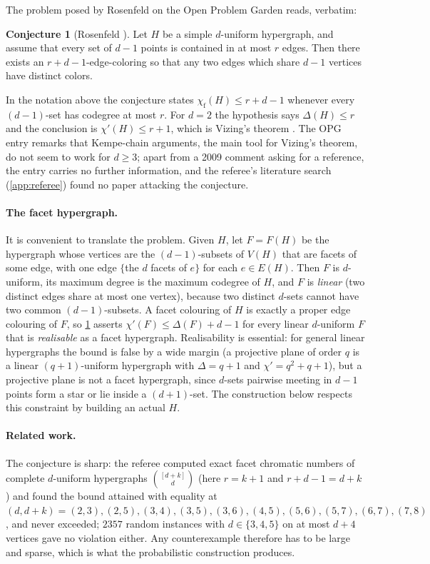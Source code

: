 \documentclass[11pt,a4paper]{article}
\theoremstyle{plain}
\theoremstyle{definition}
\newtheorem{conjecture}[theorem]{Conjecture}
\theoremstyle{remark}
\newcommand{\chif}{\chi_{\mathrm{f}}}
\begin{document}
The problem posed by Rosenfeld on the Open Problem Garden \cite{OPG} reads, verbatim:

\begin{conjecture}[{Rosenfeld \cite{OPG}}]\label{conj:rosenfeld}
Let $H$ be a simple $d$-uniform hypergraph, and assume that every set of $d-1$ points is contained in at most $r$ edges. Then there exists an $r+d-1$-edge-coloring so that any two edges which share $d-1$ vertices have distinct colors.
\end{conjecture}

In the notation above the conjecture states $\chif(H)\le r+d-1$ whenever every $(d-1)$-set has codegree at most $r$. For $d=2$ the hypothesis says $\Delta(H)\le r$ and the conclusion is $\chi'(H)\le r+1$, which is Vizing's theorem \cite{Vizing64}. The OPG entry remarks that Kempe-chain arguments, the main tool for Vizing's theorem, do not seem to work for $d\ge3$; apart from a 2009 comment asking for a reference, the entry carries no further information, and the referee's literature search (\cref{app:referee}) found no paper attacking the conjecture.

\paragraph{The facet hypergraph.} It is convenient to translate the problem. Given $H$, let $F=F(H)$ be the hypergraph whose vertices are the $(d-1)$-subsets of $V(H)$ that are facets of some edge, with one edge $\{$the $d$ facets of $e\}$ for each $e\in E(H)$. Then $F$ is $d$-uniform, its maximum degree is the maximum codegree of $H$, and $F$ is \emph{linear} (two distinct edges share at most one vertex), because two distinct $d$-sets cannot have two common $(d-1)$-subsets. A facet colouring of $H$ is exactly a proper edge colouring of $F$, so \cref{conj:rosenfeld} asserts $\chi'(F)\le\Delta(F)+d-1$ for every linear $d$-uniform $F$ that is \emph{realisable} as a facet hypergraph. Realisability is essential: for general linear hypergraphs the bound is false by a wide margin (a projective plane of order $q$ is a linear $(q+1)$-uniform hypergraph with $\Delta=q+1$ and $\chi'=q^2+q+1$), but a projective plane is not a facet hypergraph, since $d$-sets pairwise meeting in $d-1$ points form a star or lie inside a $(d+1)$-set. The construction below respects this constraint by building an actual $H$.

\paragraph{Related work.} The conjecture is sharp: the referee computed exact facet chromatic numbers of complete $d$-uniform hypergraphs $\binom{[d+k]}{d}$ (here $r=k+1$ and $r+d-1=d+k$) and found the bound attained with equality at $(d,d+k)=(2,3),(2,5),(3,4),(3,5),(3,6),(4,5),(5,6),(5,7),(6,7),(7,8)$, and never exceeded; $2357$ random instances with $d\in\{3,4,5\}$ on at most $d+4$ vertices gave no violation either. Any counterexample therefore has to be large and sparse, which is what the probabilistic construction produces.
\end{document}

